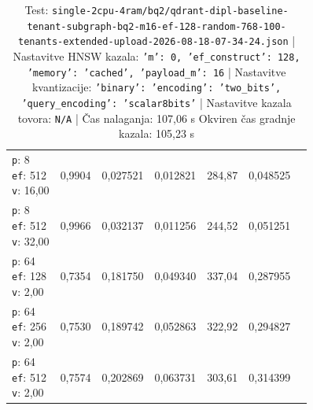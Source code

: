 \begin{table}[htbp]
\begin{tabularx}{\textwidth}{Xrrrrrr}
    \makecell{\texttt{p}: 8\\\texttt{ef}: 512\\\texttt{v}: 16,00} & 0,9904 & 0,027521 & 0,012821 & 284,87 & 0,048525 \\
    \makecell{\texttt{p}: 8\\\texttt{ef}: 512\\\texttt{v}: 32,00} & 0,9966 & 0,032137 & 0,011256 & 244,52 & 0,051251 \\
    \makecell{\texttt{p}: 64\\\texttt{ef}: 128\\\texttt{v}: 2,00} & 0,7354 & 0,181750 & 0,049340 & 337,04 & 0,287955 \\
    \makecell{\texttt{p}: 64\\\texttt{ef}: 256\\\texttt{v}: 2,00} & 0,7530 & 0,189742 & 0,052863 & 322,92 & 0,294827 \\
    \makecell{\texttt{p}: 64\\\texttt{ef}: 512\\\texttt{v}: 2,00} & 0,7574 & 0,202869 & 0,063731 & 303,61 & 0,314399 \\
    \bottomrule
  \end{tabularx}
\caption* {Test: \texttt{single-2cpu-4ram/bq2/qdrant-dipl-baseline-tenant-subgraph-bq2-m16-ef-128-random-768-100-tenants-extended-upload-2026-08-18-07-34-24.json} | Nastavitve HNSW kazala: \texttt{{'m': 0, 'ef\_construct': 128, 'memory': 'cached', 'payload\_m': 16}} | Nastavitve kvantizacije: \texttt{{'binary': {'encoding': 'two\_bits', 'query\_encoding': 'scalar8bits'}}} | Nastavitve kazala tovora: \texttt{N/A} | Čas nalaganja: 107,06 s Okviren čas gradnje kazala: 105,23 s}\end{table}


